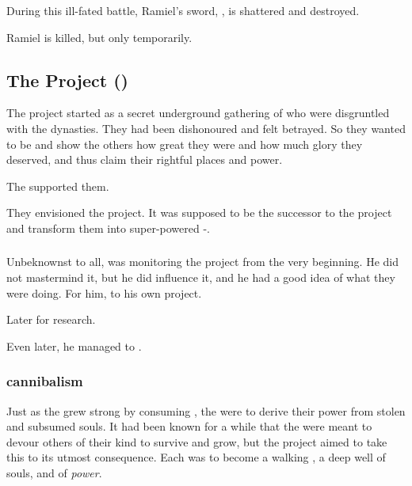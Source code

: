 During this ill-fated battle, Ramiel's sword, , is shattered and destroyed. 

Ramiel is killed, but only temporarily. 









\subsection{The \Malach{} Project ()}
The \Malach{} project started as a secret underground gathering of \resphain{} who were disgruntled with the dynasties. 
They had been dishonoured and felt betrayed. 
So they wanted to be \uber{} and show the others how great they were and how much glory they deserved, and thus claim their rightful places and power. 

The \banelords{} supported them. 

They envisioned the \Malach{} project. 
It was supposed to be the successor to the \sathariah{} project and transform them into super-powered \uber-\resphain. 





\subsubsection{\Azraid}
Unbeknownst to all, \Azraid was monitoring the \malach project from the very beginning. 
He did not mastermind it, but he did influence it, and he had a good idea of what they were doing. 
For him,  to his own  project. 

Later \Azraid {} for research. 

Even later, he managed to . 




\subsubsection{\Malach{} cannibalism}
Just as the \satharioth{} grew strong by consuming \Nexagglachel, 
the \malachim{} were to derive their power from stolen and subsumed \resphan{} souls. 
It had been known for a while that the \resphain{} were meant to devour others of their kind to survive and grow, but the \malach{} project aimed to take this to its utmost consequence. 
Each \malach{} was to become a walking \carcer, a deep well of souls, and of \emph{power}. 

